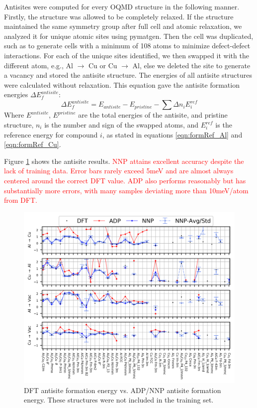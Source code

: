 \documentclass{article}
\begin{document}
Antisites were computed for every OQMD structure in the following manner.
Firstly, the structure was allowed to be completely relaxed.
If the structure maintained the same symmetry group after full cell and atomic relaxation, we analyzed it for unique atomic sites using pymatgen.
Then the cell was duplicated, such as to generate cells with a minimum of 108 atoms to minimize defect-defect interactions.
For each of the unique sites identified, we then swapped it with the different atom, e.g., Al $\rightarrow$ Cu or Cu $\rightarrow$ Al, else we deleted the site to generate a vacancy and stored the antisite structure.
The energies of all antisite structures were calculated without relaxation.
This equation gave the antisite formation energies $\Delta E^{antisite}_f$:
\begin{equation}
\Delta E^{antisite}_f = E_{antisite} - E_{pristine} - \sum\Delta n_i E^{ref}_i
\end{equation}
Where $E^{antisite}$, $E^{pristine}$ are the total energies of the antisite, and pristine structure, $n_i$ is the 
number and sign of the swapped atoms, and $E^{ref}_i$ is the reference energy for compound $i$, as stated in 
equations \ref{eqn:formRef_Al} and \ref{eqn:formRef_Cu}.

Figure \ref{fig:antisite_plot} shows the antisite results.
\textcolor{red}{NNP attains excellent accuracy despite the lack of training data.
Error bars rarely exceed 5meV and are almost always centered around the correct DFT value.
ADP also performs reasonably but has substantially more errors, with many samples deviating more than 10meV/atom from DFT. }

\begin{figure}[H]%
\centering%
\includegraphics[width=1.2\textwidth,center]{figures/antisite_vacancies.png}%
\caption{DFT antisite formation energy vs. ADP/NNP antisite formation energy.
These structures were not included in the training set.}%
\label{fig:antisite_plot}
\end{figure}
\end{document}
